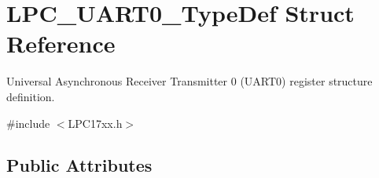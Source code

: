 \hypertarget{struct_l_p_c___u_a_r_t0___type_def}{\section{\-L\-P\-C\-\_\-\-U\-A\-R\-T0\-\_\-\-Type\-Def \-Struct \-Reference}
\label{struct_l_p_c___u_a_r_t0___type_def}
}


\-Universal \-Asynchronous \-Receiver \-Transmitter 0 (\-U\-A\-R\-T0) register structure definition.  




{\ttfamily \#include $<$\-L\-P\-C17xx.\-h$>$}

\subsection*{\-Public \-Attributes}
